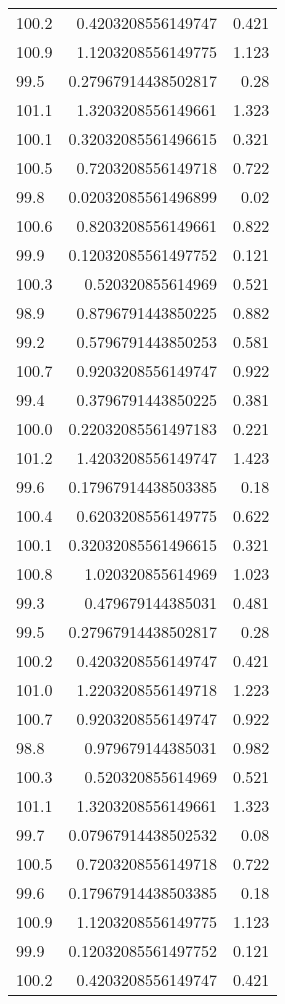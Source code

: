 \begin{table}[h!]
\begin{tabular}{l | r | r}
100.2 & 0.4203208556149747 & 0.421 \\
100.9 & 1.1203208556149775 & 1.123 \\
99.5 & 0.27967914438502817 & 0.28 \\
101.1 & 1.3203208556149661 & 1.323 \\
100.1 & 0.32032085561496615 & 0.321 \\
100.5 & 0.7203208556149718 & 0.722 \\
99.8 & 0.02032085561496899 & 0.02 \\
100.6 & 0.8203208556149661 & 0.822 \\
99.9 & 0.12032085561497752 & 0.121 \\
100.3 & 0.520320855614969 & 0.521 \\
98.9 & 0.8796791443850225 & 0.882 \\
99.2 & 0.5796791443850253 & 0.581 \\
100.7 & 0.9203208556149747 & 0.922 \\
99.4 & 0.3796791443850225 & 0.381 \\
100.0 & 0.22032085561497183 & 0.221 \\
101.2 & 1.4203208556149747 & 1.423 \\
99.6 & 0.17967914438503385 & 0.18 \\
100.4 & 0.6203208556149775 & 0.622 \\
100.1 & 0.32032085561496615 & 0.321 \\
100.8 & 1.020320855614969 & 1.023 \\
99.3 & 0.479679144385031 & 0.481 \\
99.5 & 0.27967914438502817 & 0.28 \\
100.2 & 0.4203208556149747 & 0.421 \\
101.0 & 1.2203208556149718 & 1.223 \\
100.7 & 0.9203208556149747 & 0.922 \\
98.8 & 0.979679144385031 & 0.982 \\
100.3 & 0.520320855614969 & 0.521 \\
101.1 & 1.3203208556149661 & 1.323 \\
99.7 & 0.07967914438502532 & 0.08 \\
100.5 & 0.7203208556149718 & 0.722 \\
99.6 & 0.17967914438503385 & 0.18 \\
100.9 & 1.1203208556149775 & 1.123 \\
99.9 & 0.12032085561497752 & 0.121 \\
100.2 & 0.4203208556149747 & 0.421 \\

\end{tabular}
\end{table}
